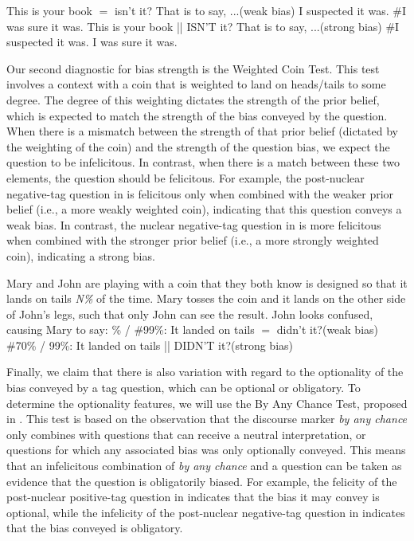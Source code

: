 \documentclass[output=paper,colorlinks,citecolor=brown]{langscibook}
\begin{document}
\is{}
\ea This is your book $=$ isn't it? That is to say, ...\hfill(weak bias)\label{Bias.Weak}
    \ea I suspected it was.\label{Bias.FolUp.Suspect1} 
    \ex \#I was sure it was.\label{Bias.FolUp.Sure1}
    \z
\ex This is your book || ISN'T it? That is to say, ...\hfill(strong bias)\label{Bias.Strong}
    \ea \#I suspected it was.\label{Bias.FolUp.Suspect2} 
    \ex I was sure it was.\label{Bias.FolUp.Sure2}
    \z
\z
{}

Our second diagnostic for bias strength is the Weighted Coin Test. This test involves a context with a coin that is weighted to land on heads/tails to some degree. The degree of this weighting dictates the strength of the prior belief, which is expected to match the strength of the bias conveyed by the question. When there is a mismatch between the strength of that prior belief (dictated by the weighting of the coin) and the strength of the question bias, we expect the question to be infelicitous. In contrast, when there is a match between these two elements, the question should be felicitous. For example, the  post-nuclear negative-tag question in  is felicitous only when combined with the weaker prior belief (i.e., a more weakly weighted coin), indicating that this question conveys a weak bias. In contrast, the nuclear negative-tag question in  is more felicitous when combined with the stronger prior belief (i.e., a more strongly weighted coin), indicating a strong bias.

\is{}
\ea Mary and John are playing with a coin that they both know is designed so that it lands on tails \textit{N\%} of the time. Mary tosses the coin and it lands on the other side of John's legs, such that only John can see the result. John looks confused, causing Mary to say:\label{WC}
    \% / \#99\%: It landed on tails $=$ didn't it?\hfill(weak bias)\label{WC.Weak}
    \ex \#70\% / 99\%: It landed on tails || DIDN'T it?\hfill(strong bias)\label{WC.Strong}
    \z
\z
{}

Finally, we claim that there is also variation with regard to the optionality of the bias conveyed by a tag question, which can be optional or obligatory. To determine the optionality features, we will use the By Any Chance Test, proposed in \citet{sadock1971}. This test is based on the observation that the discourse marker \textit{by any chance} only combines with questions that can receive a neutral interpretation, or questions for which any associated bias was only optionally conveyed. This means that an infelicitous combination of \textit{by any chance} and a question can be taken as evidence that the question is obligatorily biased. For example, the felicity of the post-nuclear positive-tag question in  indicates that the bias it may convey is optional, while the infelicity of the  post-nuclear negative-tag question in  indicates that the bias conveyed is obligatory.
\end{document}

